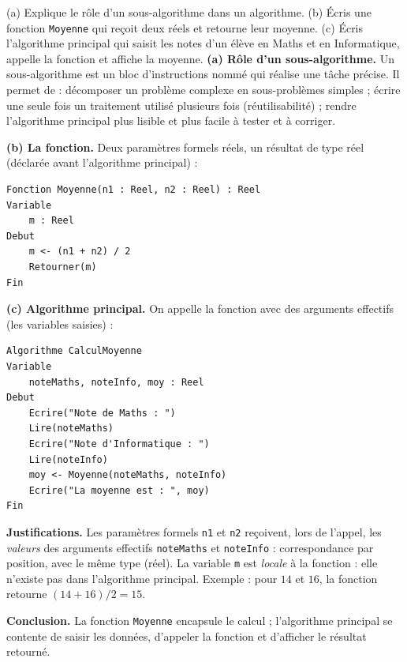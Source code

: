 \documentclass[11pt]{article}
\newcounter{popsec}
\newcounter{popsub}
\newcommand{\courssub}[1]{%
  \stepcounter{popsub}%
  \par\vspace{9pt}\noindent{\popxbold\fontsize{11.5}{13}\selectfont\color{popink}{\color{poporange}\thepopsec.\thepopsub}\hspace{6pt}#1}\par\nopagebreak\vspace{4pt}
}
\begin{document}
\begin{exoresolu}
(a) Explique le rôle d'un sous-algorithme dans un algorithme. (b) Écris une fonction \texttt{Moyenne} qui reçoit deux réels et retourne leur moyenne. (c) Écris l'algorithme principal qui saisit les notes d'un élève en Maths et en Informatique, appelle la fonction et affiche la moyenne.
\tcblower
\textbf{(a) Rôle d'un sous-algorithme.} Un sous-algorithme est un bloc d'instructions nommé qui réalise une tâche précise. Il permet de : décomposer un problème complexe en sous-problèmes simples ; écrire une seule fois un traitement utilisé plusieurs fois (réutilisabilité) ; rendre l'algorithme principal plus lisible et plus facile à tester et à corriger.

\textbf{(b) La fonction.} Deux paramètres formels réels, un résultat de type réel (déclarée avant l'algorithme principal) :
\begin{lstlisting}
Fonction Moyenne(n1 : Reel, n2 : Reel) : Reel
Variable
    m : Reel
Debut
    m <- (n1 + n2) / 2
    Retourner(m)
Fin
\end{lstlisting}

\textbf{(c) Algorithme principal.} On appelle la fonction avec des arguments effectifs (les variables saisies) :
\begin{lstlisting}
Algorithme CalculMoyenne
Variable
    noteMaths, noteInfo, moy : Reel
Debut
    Ecrire("Note de Maths : ")
    Lire(noteMaths)
    Ecrire("Note d'Informatique : ")
    Lire(noteInfo)
    moy <- Moyenne(noteMaths, noteInfo)
    Ecrire("La moyenne est : ", moy)
Fin
\end{lstlisting}

\textbf{Justifications.} Les paramètres formels \texttt{n1} et \texttt{n2} reçoivent, lors de l'appel, les \emph{valeurs} des arguments effectifs \texttt{noteMaths} et \texttt{noteInfo} : correspondance par position, avec le même type (réel). La variable \texttt{m} est \emph{locale} à la fonction : elle n'existe pas dans l'algorithme principal. Exemple : pour $14$ et $16$, la fonction retourne $(14+16)/2 = 15$.

\textbf{Conclusion.} La fonction \texttt{Moyenne} encapsule le calcul ; l'algorithme principal se contente de saisir les données, d'appeler la fonction et d'afficher le résultat retourné.
\end{exoresolu}

\courssub{Les procédures}
\end{document}
